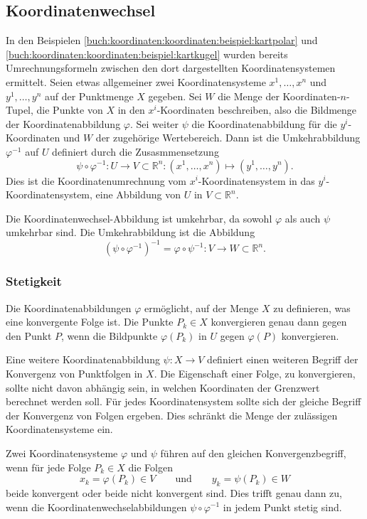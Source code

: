 
%
%
\subsection{Koordinatenwechsel}
In den Beispielen
\ref{buch:koordinaten:koordinaten:beispiel:kartpolar}
und
\ref{buch:koordinaten:koordinaten:beispiel:kartkugel}
wurden bereits Umrechnungsformeln zwischen den dort dargestellten
Koordinatensystemen ermittelt.
Seien etwas allgemeiner zwei Koordinatensysteme $x^1,\dots,x^n$
und $y^1,\dots,y^n$ auf der Punktmenge $X$ gegeben.
Sei $W$ die Menge der Koordinaten-$n$-Tupel, die Punkte von $X$
in den $x^i$-Koordinaten beschreiben, also die Bildmenge der
Koordinatenabbildung $\varphi$.
Sei weiter $\psi$ die Koordinatenabbildung für die $y^i$-Koordinaten
und $W$ der zugehörige Wertebereich.
Dann ist die Umkehrabbildung $\varphi^{-1}$ auf $U$ definiert durch die
Zusasmmensetzung
\[
\psi
\circ
\varphi^{-1}
\colon
U\to V\subset\mathbb{R}^n
:
(x^1,\dots,x^n)
\mapsto
(y^1,\dots,y^n).
\]
Dies ist die Koordinatenumrechnung vom $x^i$-Koordinatensystem in
das $y^i$-Koordinatensystem, eine Abbildung von $U$ in $V\subset\mathbb{R}^n$.


Die Koordinatenwechsel-Abbildung ist umkehrbar, da sowohl $\varphi$
als auch $\psi$ umkehrbar sind.
Die Umkehrabbildung ist die Abbildung
\[
(\psi\circ\varphi^{-1})^{-1}
=
\varphi\circ\psi^{-1}
\colon
V\to W \subset \mathbb{R}^n.
\]
%
%
\subsubsection{Stetigkeit}
Die Koordinatenabbildungen $\varphi$ ermöglicht, auf der Menge
$X$ zu definieren, was eine konvergente Folge ist.
Die Punkte $P_k\in X$ konvergieren genau dann gegen den Punkt $P$,
wenn die Bildpunkte $\varphi(P_k)$ in $U$ gegen $\varphi(P)$
konvergieren.

Eine weitere Koordinatenabbildung $\psi\colon X\to V$ definiert einen
weiteren Begriff der Konvergenz von Punktfolgen in $X$.
Die Eigenschaft einer Folge, zu konvergieren, sollte nicht davon 
abhängig sein, in welchen Koordinaten der Grenzwert berechnet
werden soll.
Für jedes Koordinatensystem sollte sich der gleiche Begriff der
Konvergenz von Folgen ergeben.
Dies schränkt die Menge der zulässigen Koordinatensysteme ein.

Zwei Koordinatensysteme $\varphi$ und $\psi$ führen auf den gleichen
Konvergenzbegriff, wenn für jede Folge $P_k\in X$ die Folgen
\[
x_k=\varphi(P_k)\in V
\qquad\text{und}\qquad
y_k=\psi(P_k)\in W
\]
beide konvergent oder beide nicht konvergent sind.
Dies trifft genau dann zu, wenn die Koordinatenwechselabbildungen
$\psi\circ\varphi^{-1}$ in jedem Punkt stetig sind.

